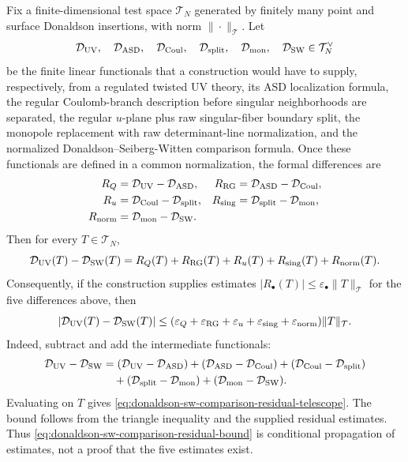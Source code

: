 Fix a finite-dimensional test space \(\mathcal T_N\) generated by finitely many
point and surface Donaldson insertions, with norm \(\|\cdot\|_{\mathcal T}\).
Let
\[
  \mathcal D_{\rm UV},\quad
  \mathcal D_{\rm ASD},\quad
  \mathcal D_{\rm Coul},\quad
  \mathcal D_{\rm split},\quad
  \mathcal D_{\rm mon},\quad
  \mathcal D_{\rm SW}
  \in \mathcal T_N^\vee
\]
be the finite linear functionals that a construction would have to supply,
respectively, from a regulated twisted UV theory, its ASD localization formula,
the regular Coulomb-branch description before singular neighborhoods are
separated, the regular \(u\)-plane plus raw singular-fiber boundary split, the
monopole replacement with raw determinant-line normalization, and the
normalized Donaldson--Seiberg-Witten comparison formula.  Once these
functionals are defined in a common normalization, the formal differences are
\begin{align}
  R_Q
  &=
  \mathcal D_{\rm UV}-\mathcal D_{\rm ASD},
  &
  R_{\rm RG}
  &=
  \mathcal D_{\rm ASD}-\mathcal D_{\rm Coul},
  \label{eq:donaldson-sw-comparison-residuals-a}\\
  R_u
  &=
  \mathcal D_{\rm Coul}-\mathcal D_{\rm split},
  &
  R_{\rm sing}
  &=
  \mathcal D_{\rm split}-\mathcal D_{\rm mon},
  \label{eq:donaldson-sw-comparison-residuals-b}\\
  R_{\rm norm}
  &=
  \mathcal D_{\rm mon}-\mathcal D_{\rm SW}.
  \label{eq:donaldson-sw-comparison-residuals-c}
\end{align}
Then for every \(T\in\mathcal T_N\),
\begin{equation}
  \mathcal D_{\rm UV}(T)-\mathcal D_{\rm SW}(T)
  =
  R_Q(T)+R_{\rm RG}(T)+R_u(T)+R_{\rm sing}(T)+R_{\rm norm}(T).
  \label{eq:donaldson-sw-comparison-residual-telescope}
\end{equation}
Consequently, if the construction supplies estimates
\(|R_\bullet(T)|\leq\varepsilon_\bullet\|T\|_{\mathcal T}\) for the five
differences above, then
\begin{equation}
  |\mathcal D_{\rm UV}(T)-\mathcal D_{\rm SW}(T)|
  \leq
  (\varepsilon_Q+\varepsilon_{\rm RG}+\varepsilon_u
  +\varepsilon_{\rm sing}+\varepsilon_{\rm norm})\|T\|_{\mathcal T}.
  \label{eq:donaldson-sw-comparison-residual-bound}
\end{equation}
Indeed, subtract and add the intermediate functionals:
\[
\begin{aligned}
  \mathcal D_{\rm UV}-\mathcal D_{\rm SW}
  &=
  (\mathcal D_{\rm UV}-\mathcal D_{\rm ASD})
  +
  (\mathcal D_{\rm ASD}-\mathcal D_{\rm Coul})
  +
  (\mathcal D_{\rm Coul}-\mathcal D_{\rm split})\\
  &\quad+
  (\mathcal D_{\rm split}-\mathcal D_{\rm mon})
  +
  (\mathcal D_{\rm mon}-\mathcal D_{\rm SW}).
\end{aligned}
\]
Evaluating on \(T\) gives
\eqref{eq:donaldson-sw-comparison-residual-telescope}.  The bound follows from
the triangle inequality and the supplied residual estimates.  Thus
\eqref{eq:donaldson-sw-comparison-residual-bound} is conditional propagation
of estimates, not a proof that the five estimates exist.

